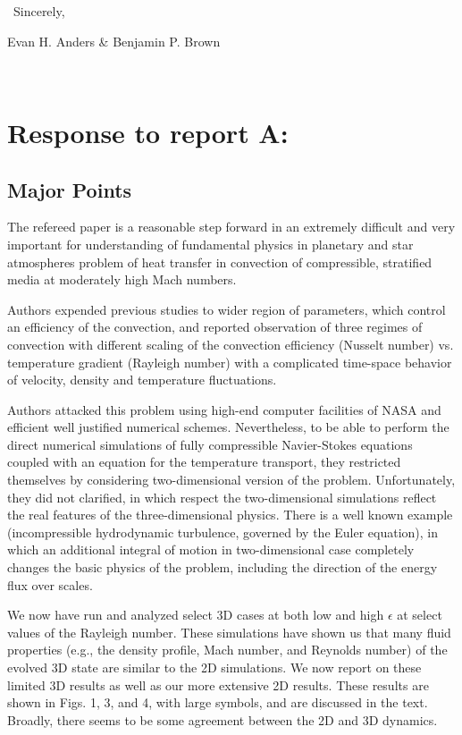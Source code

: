\documentclass[aps, 11pt, singlecolumn]{revtex4-1} %
\begin{document}
\begin{singlespace}
$\,$\newline
\noindent
Sincerely,

Evan H. Anders \& Benjamin P. Brown




$\,$
\newline
$\,$
\newline

\section{Response to report A:}
\subsection{Major Points}

\begin{myquotation}
The refereed paper is a reasonable step forward in an extremely
difficult and very important for understanding of fundamental physics
in planetary and star atmospheres problem of heat transfer in
convection of compressible, stratified media at moderately high Mach
numbers.

Authors expended previous studies to wider region of parameters, which
control an efficiency of the convection, and reported observation of
three regimes of convection with different scaling of the convection
efficiency (Nusselt number) vs. temperature gradient (Rayleigh number)
with a complicated time-space behavior of velocity, density and
temperature fluctuations.

Authors attacked this problem using high-end computer facilities of
NASA and efficient well justified numerical schemes. Nevertheless, to
be able to perform the direct numerical simulations of fully
compressible Navier-Stokes equations coupled with an equation for the
temperature transport, they restricted themselves by considering
two-dimensional version of the problem. Unfortunately, they did not
clarified, in which respect the two-dimensional simulations reflect
the real features of the three-dimensional physics. There is a well
known example (incompressible hydrodynamic turbulence, governed by the
Euler equation), in which an additional integral of motion in
two-dimensional case completely changes the basic physics of the
problem, including the direction of the energy flux over scales.
\end{myquotation}

We now have run and analyzed select 3D cases at both low and high $\epsilon$
at select values of the Rayleigh number.  These simulations have shown
us that many fluid properties (e.g., the density profile, Mach number, and Reynolds number)
of the evolved 3D state are similar to the 2D simulations.  We now report on these
limited 3D results as well as our more extensive 2D results. These results are shown
in Figs. 1, 3, and 4, with large symbols, and are discussed in the text.
Broadly, there seems to be some agreement between the 2D and 3D dynamics.


\end{singlespace}
\end{document}
